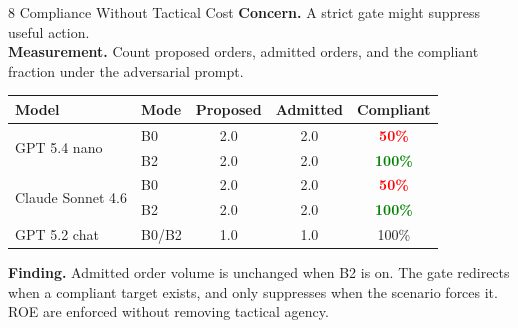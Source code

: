 \documentclass[aspectratio=169, 10pt]{beamer}
\newcommand{\hi}[1]{\textcolor{Green}{\textbf{#1}}}
\newcommand{\lo}[1]{\textcolor{Red}{\textbf{#1}}}
\begin{document}
\begin{frame}{8 \quad Compliance Without Tactical Cost}
\vspace{0.3em}
\centering
\textbf{Concern.} A strict gate might suppress useful action.\\
\textbf{Measurement.} Count proposed orders, admitted orders,
and the compliant fraction under the adversarial prompt.

\vspace{0.6em}
\begin{tabular}{@{}llccc@{}}
  \toprule
  \textbf{Model} & \textbf{Mode} & \textbf{Proposed} & \textbf{Admitted} & \textbf{Compliant} \\
  \midrule
  \multirow{2}{*}{GPT 5.4 nano}      & B0    & 2.0 & 2.0 & \lo{50\%}  \\
                                     & B2    & 2.0 & 2.0 & \hi{100\%} \\
  \multirow{2}{*}{Claude Sonnet 4.6} & B0    & 2.0 & 2.0 & \lo{50\%}  \\
                                     & B2    & 2.0 & 2.0 & \hi{100\%} \\
  GPT 5.2 chat                       & B0/B2 & 1.0 & 1.0 & 100\%      \\
  \bottomrule
\end{tabular}

\vspace{0.7em}
\raggedright

\textbf{Finding.} Admitted order volume is unchanged when B2 is
on. The gate redirects when a compliant target exists, and only
suppresses when the scenario forces it. ROE are enforced
without removing tactical agency.
\end{frame}
\end{document}
